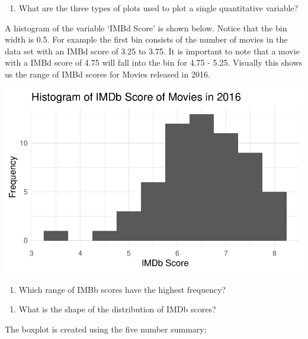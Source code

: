 \documentclass[
]{report}
\providecommand{\tightlist}{%
  \setlength{\itemsep}{0pt}\setlength{\parskip}{0pt}}
\begin{document}
\begin{enumerate}
\def\labelenumi{\arabic{enumi}.}
\setcounter{enumi}{6}
\tightlist
\item
  What are the three types of plots used to plot a single quantitative variable?
\end{enumerate}

\vspace{0.5in}

A histogram of the variable `IMBd Score' is shown below. Notice that the bin width is 0.5. For example the first bin consists of the number of movies in the data set with an IMBd score of 3.25 to 3.75. It is important to note that a movie with a IMBd score of 4.75 will fall into the bin for 4.75 - 5.25. Visually this shows us the range of IMBd scores for Movies released in 2016.

\begin{center}\includegraphics[width=0.7\linewidth]{04-EDA-quantitative_files/figure-latex/unnamed-chunk-3-1} \end{center}

\begin{enumerate}
\def\labelenumi{\arabic{enumi}.}
\setcounter{enumi}{7}
\tightlist
\item
  Which range of IMBb scores have the highest frequency?
\end{enumerate}

\vspace{0.5in}

\begin{enumerate}
\def\labelenumi{\arabic{enumi}.}
\setcounter{enumi}{8}
\tightlist
\item
  What is the shape of the distribution of IMDb scores?
\end{enumerate}

\vspace{0.5in}

The boxplot is created using the five number summary:
\end{document}
